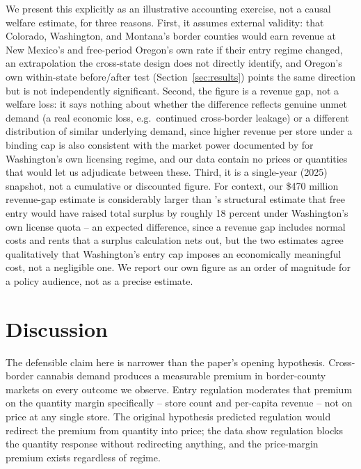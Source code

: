\documentclass[12pt]{article}
\begin{document}
We present this explicitly as an illustrative accounting exercise, not a causal welfare estimate, for three
reasons. First, it assumes external validity: that Colorado, Washington, and Montana's border counties would
earn revenue at New Mexico's and free-period Oregon's own rate if their entry regime changed, an extrapolation
the cross-state design does not directly identify, and Oregon's own within-state before/after test
(Section~\ref{sec:results}) points the same direction but is not independently significant. Second, the figure
is a revenue gap, not a welfare loss: it says nothing about whether the difference reflects genuine unmet
demand (a real economic loss, e.g.\ continued cross-border leakage) or a different distribution of similar
underlying demand, since higher revenue per store under a binding cap is also consistent with the market
power documented by \citet{HollenbeckUetake2021} for Washington's own licensing regime, and our data contain
no prices or quantities that would let us adjudicate between these. Third, it is a single-year (2025) snapshot,
not a cumulative or discounted figure. For context, our \$470 million revenue-gap estimate is considerably
larger than \citet{Thomas2019LicenseQuotas}'s structural estimate that free entry would have raised total
surplus by roughly 18 percent under Washington's own license quota -- an expected difference, since a revenue
gap includes normal costs and rents that a surplus calculation nets out, but the two estimates agree
qualitatively that Washington's entry cap imposes an economically meaningful cost, not a negligible one. We
report our own figure as an order of magnitude for a policy audience, not as a precise estimate.

\section{Discussion}
\label{sec:discussion}

The defensible claim here is narrower than the paper's opening hypothesis. Cross-border cannabis demand
produces a measurable premium in border-county markets on every outcome we observe. Entry regulation
moderates that premium on the quantity margin specifically -- store count and per-capita revenue -- not on
price at any single store. The original hypothesis predicted regulation would redirect the premium from
quantity into price; the data show regulation blocks the quantity response without redirecting anything, and
the price-margin premium exists regardless of regime.
\end{document}
